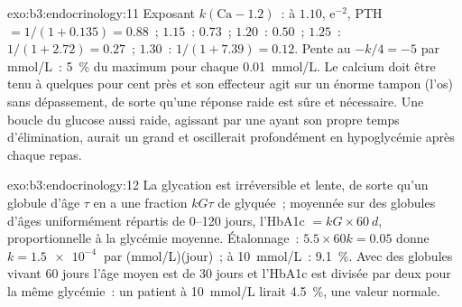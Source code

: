 \begin{solution}{exo:b3:endocrinology:11}
Exposant $k(\text{Ca} - 1.2)$~: à $1.10$, $\mathrm{e}^{-2}$, PTH $= 1/
(1 + 0.135) = 0.88$~; $1.15$~: $0.73$~; $1.20$~: $0.50$~; $1.25$~: $1/(1 +
2.72) = 0.27$~; $1.30$~: $1/(1 + 7.39) = 0.12$. Pente au 
$-k/4 = -5$ par mmol/L~: \qty{5}{\%} du maximum pour chaque
\qty{0.01}{mmol/L}. Le calcium doit être tenu à quelques pour cent près
et son effecteur agit sur un énorme tampon (l'os) sans dépassement, de
sorte qu'une réponse raide est sûre et nécessaire. Une boucle du glucose
aussi raide, agissant par une  ayant son propre temps
d'élimination, aurait un grand  et oscillerait profondément
en hypoglycémie après chaque repas.
\end{solution}

\begin{solution}{exo:b3:endocrinology:12}
La glycation est irréversible et lente, de sorte qu'un globule d'âge
$\tau$ en a une fraction $kG\tau$ de glyquée~; moyennée sur des globules
d'âges uniformément répartis de \numrange{0}{120} jours, l'HbA1c
$= kG\times\qty{60}{d}$, proportionnelle à la glycémie moyenne.
Étalonnage~: $5.5\times 60k = 0.05$ donne $k =
\qty{1.5e-4}{}$ par (mmol/L)(jour)~; à \qty{10}{mmol/L}~: \qty{9.1}{\%}.
Avec des globules vivant 60 jours l'âge moyen est de 30 jours et l'HbA1c
est divisée par deux pour la même glycémie~: un patient à
\qty{10}{mmol/L} lirait \qty{4.5}{\%}, une valeur normale.
\end{solution}

